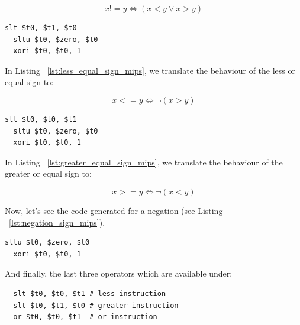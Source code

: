 \documentclass[
  oneside,
  11pt, a4paper,
  footinclude=true,
  headinclude=true,
  cleardoublepage=empty
]{scrbook}
\begin{document}
\begin{equation}
  x != y \iff ( x < y \lor x > y)
\end{equation}

\begin{lstlisting}[caption={Code generated for less or equal sign in MIPS},label={lst:less_equal_sign_mips}]
  slt $t0, $t1, $t0	
  sltu $t0, $zero, $t0	
  xori $t0, $t0, 1	
\end{lstlisting}

In Listing ~\ref{lst:less_equal_sign_mips}, we translate the behaviour of the less or equal sign to:

\begin{equation}
  x <= y \iff \lnot ( x > y)
\end{equation}

\begin{lstlisting}[caption={Code generated for greater or equal sign in MIPS},label={lst:greater_equal_sign_mips}]
  slt $t0, $t0, $t1	
  sltu $t0, $zero, $t0	
  xori $t0, $t0, 1	
\end{lstlisting}

In Listing ~\ref{lst:greater_equal_sign_mips}, we translate the behaviour of the greater or equal sign to:

\begin{equation}
  x >= y \iff \lnot ( x < y )
\end{equation}

Now, let's see the code generated for a negation (see Listing ~\ref{lst:negation_sign_mips}).

\begin{lstlisting}[caption={Code generated for negation sign in MIPS},label={lst:negation_sign_mips}]
  sltu $t0, $zero, $t0	
  xori $t0, $t0, 1	
\end{lstlisting}



And finally, the last three operators which are available under:

\begin{lstlisting}
  slt $t0, $t0, $t1	# less instruction
  slt $t0, $t1, $t0	# greater instruction
  or $t0, $t0, $t1	# or instruction
\end{lstlisting}
\end{document}
